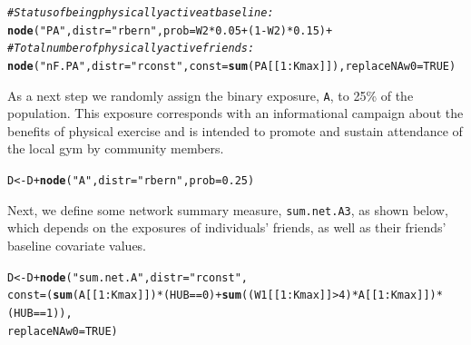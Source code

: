 \documentclass[english]{article}\usepackage[]{graphicx}\usepackage[]{color}
\makeatletter
\newcommand{\hlnum}[1]{\textcolor[rgb]{0.686,0.059,0.569}{#1}}%
\newcommand{\hlstr}[1]{\textcolor[rgb]{0.192,0.494,0.8}{#1}}%
\newcommand{\hlcom}[1]{\textcolor[rgb]{0.678,0.584,0.686}{\textit{#1}}}%
\newcommand{\hlopt}[1]{\textcolor[rgb]{0,0,0}{#1}}%
\newcommand{\hlstd}[1]{\textcolor[rgb]{0.345,0.345,0.345}{#1}}%
\newcommand{\hlkwb}[1]{\textcolor[rgb]{0.69,0.353,0.396}{#1}}%
\newcommand{\hlkwc}[1]{\textcolor[rgb]{0.333,0.667,0.333}{#1}}%
\newcommand{\hlkwd}[1]{\textcolor[rgb]{0.737,0.353,0.396}{\textbf{#1}}}%
\newenvironment{kframe}{%
 \def\at@end@of@kframe{}%
 \ifinner\ifhmode%
  \def\at@end@of@kframe{\end{minipage}}%
  \begin{minipage}{\columnwidth}%
 \fi\fi%
 \def\FrameCommand##1{\hskip\@totalleftmargin \hskip-\fboxsep
 \colorbox{shadecolor}{##1}\hskip-\fboxsep
     \hskip-\linewidth \hskip-\@totalleftmargin \hskip\columnwidth}%
 \MakeFramed {\advance\hsize-\width
   \@totalleftmargin\z@ \linewidth\hsize
   \@setminipage}}%
 {\par\unskip\endMakeFramed%
 \at@end@of@kframe}
\newenvironment{knitrout}{}{} %
\theoremstyle{plain}
\theoremstyle{plain}
\makeatother
\begin{document}
\begin{knitrout}
\begin{kframe}
\begin{alltt}
\hlcom{# Status of being physically active at baseline:}
  \hlkwd{node}\hlstd{(}\hlstr{"PA"}\hlstd{,} \hlkwc{distr} \hlstd{=} \hlstr{"rbern"}\hlstd{,} \hlkwc{prob} \hlstd{= W2}\hlopt{*}\hlnum{0.05} \hlopt{+} \hlstd{(}\hlnum{1}\hlopt{-}\hlstd{W2)}\hlopt{*}\hlnum{0.15}\hlstd{)} \hlopt{+}
\hlcom{# Total number of physically active friends:}
  \hlkwd{node}\hlstd{(}\hlstr{"nF.PA"}\hlstd{,} \hlkwc{distr} \hlstd{=} \hlstr{"rconst"}\hlstd{,} \hlkwc{const} \hlstd{=} \hlkwd{sum}\hlstd{(PA[[}\hlnum{1}\hlopt{:}\hlstd{Kmax]]),} \hlkwc{replaceNAw0} \hlstd{=} \hlnum{TRUE}\hlstd{)}
\end{alltt}
\end{kframe}
\end{knitrout}

As a next step we randomly assign the binary exposure, \texttt{A}, to 25\% of the population. This exposure corresponds with an informational campaign about the benefits of physical exercise and is intended to promote and sustain attendance of the local gym by community members.

\begin{knitrout}\footnotesize
{}\color{fgcolor}\begin{kframe}
\begin{alltt}
\hlstd{D} \hlkwb{<-} \hlstd{D} \hlopt{+} \hlkwd{node}\hlstd{(}\hlstr{"A"}\hlstd{,} \hlkwc{distr} \hlstd{=} \hlstr{"rbern"}\hlstd{,} \hlkwc{prob} \hlstd{=} \hlnum{0.25}\hlstd{)}
\end{alltt}
\end{kframe}
\end{knitrout}

Next, we define some network summary measure, \texttt{sum.net.A3}, as shown below, which depends on the exposures of individuals' friends, as well as their friends' baseline covariate values.


\begin{knitrout}\footnotesize
{}\color{fgcolor}\begin{kframe}
\begin{alltt}
\hlstd{D} \hlkwb{<-} \hlstd{D} \hlopt{+} \hlkwd{node}\hlstd{(}\hlstr{"sum.net.A"}\hlstd{,} \hlkwc{distr} \hlstd{=} \hlstr{"rconst"}\hlstd{,}
  \hlkwc{const} \hlstd{= (}\hlkwd{sum}\hlstd{(A[[}\hlnum{1}\hlopt{:}\hlstd{Kmax]])}\hlopt{*}\hlstd{(HUB}\hlopt{==}\hlnum{0}\hlstd{)} \hlopt{+} \hlkwd{sum}\hlstd{((W1[[}\hlnum{1}\hlopt{:}\hlstd{Kmax]]} \hlopt{>} \hlnum{4}\hlstd{)}\hlopt{*}\hlstd{A[[}\hlnum{1}\hlopt{:}\hlstd{Kmax]])}\hlopt{*}\hlstd{(HUB}\hlopt{==}\hlnum{1}\hlstd{)),}
  \hlkwc{replaceNAw0} \hlstd{=} \hlnum{TRUE}\hlstd{)}
\end{alltt}
\end{kframe}
\end{knitrout}
\end{document}
